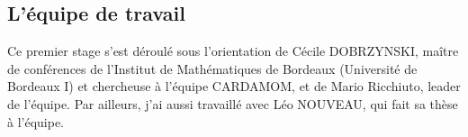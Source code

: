\subsection{L'équipe de travail}

\indent Ce premier stage s'est déroulé sous l'orientation de Cécile DOBRZYNSKI, maître de conférences de l'Institut de Mathématiques de Bordeaux (Université de Bordeaux I) et chercheuse à l'équipe CARDAMOM, et de Mario Ricchiuto, leader de l'équipe. Par ailleurs, j'ai aussi travaillé avec Léo NOUVEAU, qui fait sa thèse à l'équipe.

%
%
